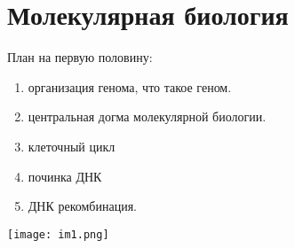 ﻿\chapter{Молекулярная биология}
План на первую половину: 
\begin{enumerate}
\item организация генома, что такое геном. 
\item центральная догма молекулярной биологии.
\item клеточный цикл
\item починка ДНК
\item ДНК рекомбинация. 
\end{enumerate}

\texttt{[image: im1.png]}